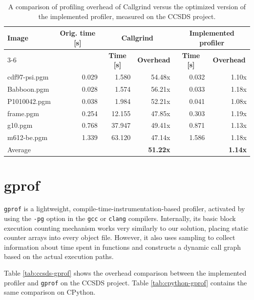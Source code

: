 \begin{table}[t]
    \centering
    \begin{tabular}{lrrrrr}
    \multicolumn{1}{l}{\multirow{2}{*}{\textbf{Image}}} & \multicolumn{1}{c}{\multirow{2}{*}{\textbf{Orig. time [s]}}} & \multicolumn{2}{c}{\textbf{Callgrind}} & \multicolumn{2}{c}{\textbf{Implemented profiler}} \\
    \cline{3-6} 
    \multicolumn{1}{l}{} & \multicolumn{1}{c}{} & \multicolumn{1}{c}{\textbf{Time [s]}} & \multicolumn{1}{c}{\textbf{Overhead}} & \multicolumn{1}{c}{\textbf{Time [s]}} & \multicolumn{1}{c}{\textbf{Overhead}} \\ 
    \hline
    \hline
    cdf97-psi.pgm & 0.029 & 1.580 & 54.48x & 0.032 & 1.10x \\
    Babboon.pgm & 0.028 & 1.574 & 56.21x  & 0.033 & 1.18x \\
    P1010042.pgm & 0.038 & 1.984 & 52.21x & 0.041 & 1.08x \\
    frame.pgm & 0.254 & 12.155 & 47.85x & 0.303 & 1.19x \\
    g10.pgm & 0.768 & 37.947 & 49.41x & 0.871 & 1.13x \\
    m612-be.pgm & 1.339 & 63.120 & 47.14x & 1.586 & 1.18x \\
    \hline
    \multicolumn{1}{l}{Average} & & & \textbf{51.22x} & & \textbf{1.14x} \\
    \end{tabular}
    \caption{A comparison of profiling overhead of Callgrind versus the optimized version of the implemented profiler, measured on the CCSDS project.}
    \label{tab:ccsds-callgrind}
\end{table}


\section{gprof}


\texttt{gprof} is a lightweight, compile-time-instrumentation-based profiler, activated by using the \texttt{-pg} option in the \texttt{gcc} or \texttt{clang} compilers. Internally, its basic block execution counting mechanism works very similarly to our solution, placing static counter arrays into every object file. However, it also uses sampling to collect information about time spent in functions and constructs a dynamic call graph based on the actual execution paths. \cite{gprof-man, gprof-paper}

Table \ref{tab:ccsds-gprof} shows the overhead comparison between the implemented profiler and \texttt{gprof} on the CCSDS project. Table \ref{tab:cpython-gprof} contains the same comparison on CPython.
 

